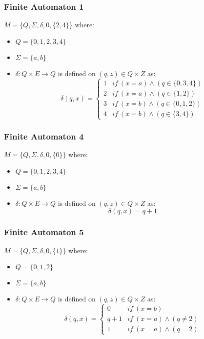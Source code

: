 \documentclass[letterpaper, 12pt]{math}
\begin{document}
\subsubsection*{Finite Automaton 1}
\( M = \{Q,\Sigma,\delta,0,\{2,4\}\} \) where:
\begin{itemize}
  \item \( Q = \{0,1,2,3,4\} \)
  \item \( \Sigma = \{a,b\} \)
  \item \( \delta: Q\times E\to Q \) is defined on \( (q,z)\in Q\times Z \) as:
    \[ \delta(q,x) = \begin{cases}
      1 & if\ (x = a) \wedge (q\in\{0,3,4\}) \\
      2 & if\ (x = a) \wedge (q\in\{1,2\})   \\
      3 & if\ (x = b) \wedge (q\in\{0,1,2\}) \\
      4 & if\ (x = b) \wedge (q\in\{3,4\})
    \end{cases} \]
\end{itemize}

\subsubsection*{Finite Automaton 4}
\( M = \{Q,\Sigma,\delta,0,\{0\}\} \) where:
\begin{itemize}
  \item \( Q = \{0,1,2,3,4\} \)
  \item \( \Sigma = \{a,b\} \)
  \item \( \delta: Q\times E\to Q \) is defined on \( (q,z)\in Q\times Z \) as:
    \[ \delta(q,x) = q+1 \]
\end{itemize}

\subsubsection*{Finite Automaton 5}
\( M = \{Q,\Sigma,\delta,0,\{1\}\} \) where:
\begin{itemize}
  \item \( Q = \{0,1,2\} \)
  \item \( \Sigma = \{a,b\} \)
  \item \( \delta: Q\times E\to Q \) is defined on \( (q,z)\in Q\times Z \) as:
    \[ \delta(q,x) = \begin{cases}
      0 & if\ (x = b) \\
      q+1 & if\ (x = a) \wedge (q \ne 2) \\
      1 & if\ (x = a) \wedge (q = 2)
    \end{cases} \]
\end{itemize}
\end{document}
